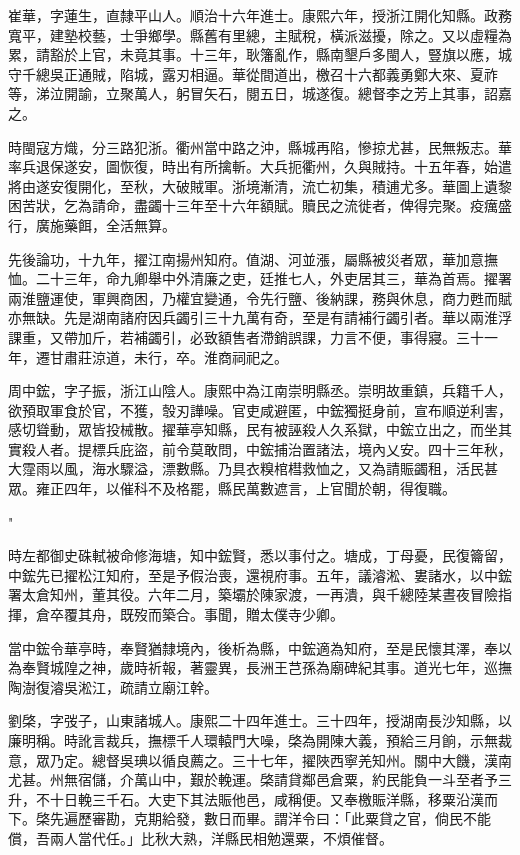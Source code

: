 \begin{pinyinscope}
崔華，字蓮生，直隸平山人。順治十六年進士。康熙六年，授浙江開化知縣。政務寬平，建塾校藝，士爭鄉學。縣舊有里總，主賦稅，橫派滋擾，除之。又以虛糧為累，請豁於上官，未竟其事。十三年，耿籓亂作，縣南墾戶多閩人，豎旗以應，城守千總吳正通賊，陷城，露刃相逼。華從間道出，檄召十六都義勇鄭大來、夏祚等，涕泣開諭，立聚萬人，躬冒矢石，閱五日，城遂復。總督李之芳上其事，詔嘉之。

時閩寇方熾，分三路犯浙。衢州當中路之沖，縣城再陷，慘掠尤甚，民無叛志。華率兵退保遂安，圖恢復，時出有所擒斬。大兵扼衢州，久與賊持。十五年春，始遣將由遂安復開化，至秋，大破賊軍。浙境漸清，流亡初集，積逋尤多。華圖上遺黎困苦狀，乞為請命，盡蠲十三年至十六年額賦。贖民之流徙者，俾得完聚。疫癘盛行，廣施藥餌，全活無算。

先後論功，十九年，擢江南揚州知府。值湖、河並漲，屬縣被災者眾，華加意撫恤。二十三年，命九卿舉中外清廉之吏，廷推七人，外吏居其三，華為首焉。擢署兩淮鹽運使，軍興商困，乃權宜變通，令先行鹽、後納課，務與休息，商力甦而賦亦無缺。先是湖南諸府因兵蠲引三十九萬有奇，至是有請補行蠲引者。華以兩淮浮課重，又帶加斤，若補蠲引，必致額售者滯銷誤課，力言不便，事得寢。三十一年，遷甘肅莊涼道，未行，卒。淮商祠祀之。

周中鋐，字子振，浙江山陰人。康熙中為江南崇明縣丞。崇明故重鎮，兵籍千人，欲預取軍食於官，不獲，彀刃譁噪。官吏咸避匿，中鋐獨挺身前，宣布順逆利害，感切聳動，眾皆投械散。擢華亭知縣，民有被誣殺人久系獄，中鋐立出之，而坐其實殺人者。提標兵庇盜，前令莫敢問，中鋐捕治置諸法，境內乂安。四十三年秋，大霪雨以風，海水驟溢，漂數縣。乃具衣糗棺槥救恤之，又為請賑蠲租，活民甚眾。雍正四年，以催科不及格罷，縣民萬數遮言，上官聞於朝，得復職。

"

時左都御史硃軾被命修海塘，知中鋐賢，悉以事付之。塘成，丁母憂，民復籥留，中鋐先已擢松江知府，至是予假治喪，還視府事。五年，議濬淞、婁諸水，以中鋐署太倉知州，董其役。六年二月，築壩於陳家渡，一再潰，與千總陸某晝夜冒險指揮，倉卒覆其舟，既歿而築合。事聞，贈太僕寺少卿。

當中鋐令華亭時，奉賢猶隸境內，後析為縣，中鋐適為知府，至是民懷其澤，奉以為奉賢城隍之神，歲時祈報，著靈異，長洲王芑孫為廟碑紀其事。道光七年，巡撫陶澍復濬吳淞江，疏請立廟江幹。

劉棨，字弢子，山東諸城人。康熙二十四年進士。三十四年，授湖南長沙知縣，以廉明稱。時訛言裁兵，撫標千人環轅門大噪，棨為開陳大義，預給三月餉，示無裁意，眾乃定。總督吳琠以循良薦之。三十七年，擢陜西寧羌知州。關中大饑，漢南尤甚。州無宿儲，介萬山中，艱於輓運。棨請貸鄰邑倉粟，約民能負一斗至者予三升，不十日輓三千石。大吏下其法賑他邑，咸稱便。又奉檄賑洋縣，移粟沿漢而下。棨先遍歷審勘，克期給發，數日而畢。謂洋令曰：「此粟貸之官，倘民不能償，吾兩人當代任。」比秋大熟，洋縣民相勉還粟，不煩催督。


\end{pinyinscope}
